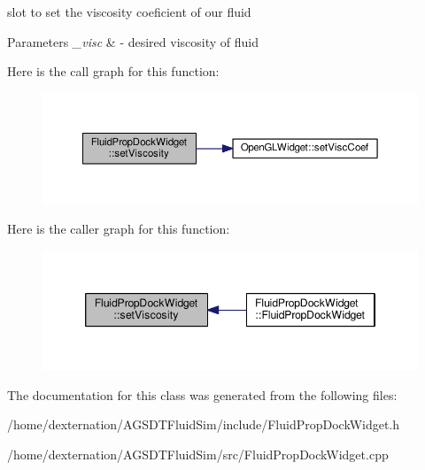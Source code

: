 slot to set the viscosity coeficient of our fluid 


\begin{DoxyParams}{Parameters}
{\em \-\_\-visc} & -\/ desired viscosity of fluid \\
\hline
\end{DoxyParams}


Here is the call graph for this function\-:\nopagebreak
\begin{figure}[H]
\begin{center}
\leavevmode
\includegraphics[width=350pt]{class_fluid_prop_dock_widget_a473ce1156c2ab118e6af5d99ec700764_cgraph}
\end{center}
\end{figure}




Here is the caller graph for this function\-:\nopagebreak
\begin{figure}[H]
\begin{center}
\leavevmode
\includegraphics[width=346pt]{class_fluid_prop_dock_widget_a473ce1156c2ab118e6af5d99ec700764_icgraph}
\end{center}
\end{figure}




The documentation for this class was generated from the following files\-:\begin{DoxyCompactItemize}
\item 
/home/dexternation/\-A\-G\-S\-D\-T\-Fluid\-Sim/include/Fluid\-Prop\-Dock\-Widget.\-h\item 
/home/dexternation/\-A\-G\-S\-D\-T\-Fluid\-Sim/src/Fluid\-Prop\-Dock\-Widget.\-cpp\end{DoxyCompactItemize}
